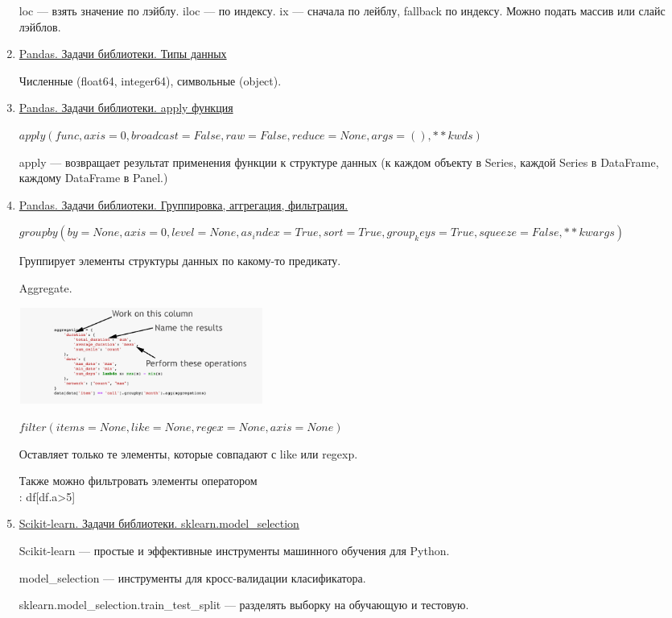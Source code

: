 \documentclass{proc}
\begin{document}
\begin{enumerate}
		loc --- взять значение по лэйблу. iloc --- по индексу. ix --- сначала по лейблу, fallback по индексу. Можно подать массив или слайс лэйблов.
		
		\item \uline{Pandas. Задачи библиотеки. Типы данных}
		
		Численные (float64, integer64), символьные (object).
		
		\item \uline{Pandas. Задачи библиотеки. apply функция}
		
		$apply(func, axis=0, broadcast=False, raw=False, reduce=None, args=(), **kwds)$
		
		apply --- возвращает результат применения функции к структуре данных (к каждом объекту в Series, каждой Series в DataFrame, каждому DataFrame в Panel.)
		
		\item \uline{Pandas. Задачи библиотеки. Группировка, аггрегация, фильтрация.}
		
		$groupby(by=None, axis=0, level=None, as_index=True, sort=True, group_keys=True, squeeze=False, **kwargs)$
		
		Группирует элементы структуры данных по какому-то предикату.
		
		Aggregate.
		
		\includegraphics[width=8cm]{aggregate}
		
		$filter(items=None, like=None, regex=None, axis=None)$
		
		Оставляет только те элементы, которые совпадают с like или regexp.
		
		Также можно фильтровать элементы оператором \[\]: df[df.a>5]
		
		\item \uline{Scikit-learn. Задачи библиотеки. sklearn.model\_selection}
		
		Scikit-learn --- простые и эффективные инструменты машинного обучения для Python.
		
		model\_selection --- инструменты для кросс-валидации класификатора.
		
		sklearn.model\_selection.train\_test\_split --- разделять выборку на обучающую и тестовую.
		

\end{enumerate}
\end{document}
